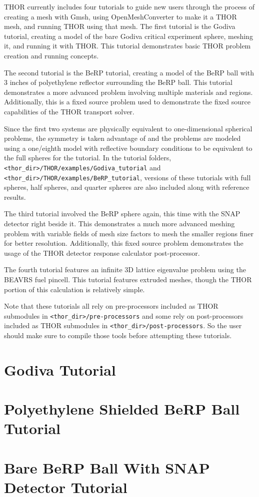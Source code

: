 \ac{THOR} currently includes four tutorials to guide new users through the process of creating a mesh with Gmsh, using OpenMeshConverter to make it a \ac{THOR} mesh, and running \ac{THOR} using that mesh.
The first tutorial is the Godiva tutorial, creating a model of the bare Godiva critical experiment sphere, meshing it, and running it with \ac{THOR}.
This tutorial demonstrates basic \ac{THOR} problem creation and running concepts.

The second tutorial is the BeRP tutorial, creating a model of the BeRP ball with 3 inches of polyethylene reflector surrounding the BeRP ball.
This tutorial demonstrates a more advanced problem involving multiple materials and regions.
Additionally, this is a fixed source problem used to demonstrate the fixed source capabilities of the THOR transport solver.

Since the first two systems are physically equivalent to one-dimensional spherical problems, the symmetry is taken advantage of and the problems are modeled using a one/eighth model with reflective boundary conditions to be equivalent to the full spheres for the tutorial.
In the tutorial folders, \\
\verb"<thor_dir>/THOR/examples/Godiva_tutorial" and \verb"<thor_dir>/THOR/examples/BeRP_tutorial", versions of these tutorials with full spheres, half spheres, and quarter spheres are also included along with reference results.

The third tutorial involved the BeRP sphere again, this time with the SNAP detector right beside it.
This demonstrates a much more advanced meshing problem with variable fields of mesh size factors to mesh the smaller regions finer for better resolution.
Additionally, this fixed source problem demonstrates the usage of the THOR detector response calculator post-processor.

The fourth tutorial features an infinite 3D lattice eigenvalue problem using the BEAVRS fuel pincell.
This tutorial features extruded meshes, though the THOR portion of this calculation is relatively simple.

Note that these tutorials all rely on pre-processors included as THOR submodules in \verb"<thor_dir>/pre-processors" and some rely on post-processors included as THOR submodules in \verb"<thor_dir>/post-processors".
So the user should make sure to compile those tools before attempting these tutorials.

\section{Godiva Tutorial}



\section{Polyethylene Shielded BeRP Ball Tutorial}



\section{Bare BeRP Ball With SNAP Detector Tutorial}


